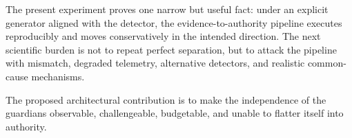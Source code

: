 The present experiment proves one narrow but useful fact: under an explicit generator aligned with the detector, the evidence-to-authority pipeline executes reproducibly and moves conservatively in the intended direction. The next scientific burden is not to repeat perfect separation, but to attack the pipeline with mismatch, degraded telemetry, alternative detectors, and realistic common-cause mechanisms.

The proposed architectural contribution is to make the independence of the guardians observable, challengeable, budgetable, and unable to flatter itself into authority.